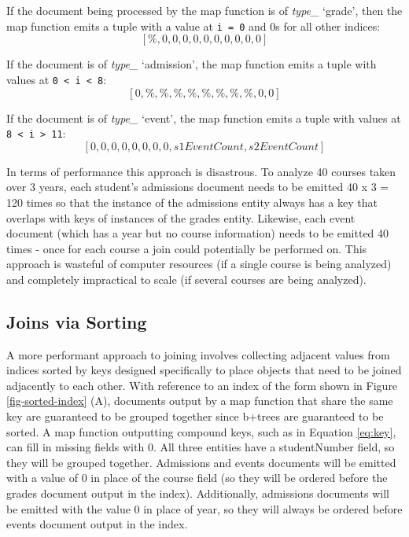 If the document being processed by the map function is of \textit{type\_} ‘grade’, then the map function emits a tuple with a value at \texttt{i = 0} and 0s for all other indices: \[[\%, 0, 0, 0, 0, 0, 0, 0, 0, 0, 0]\]

If the document is of \textit{type\_} `admission', the map function emits a tuple with values at \texttt{0 < i < 8}: \[[0, \%, \%, \%, \%, \%, \%, \%, \%, 0, 0]\]

If the document is of \textit{type\_} ‘event’, the map function emits a tuple with values at \texttt{8 < i > 11}: \[[0, 0, 0, 0, 0, 0, 0, 0, s1EventCount, s2EventCount]\]

In terms of performance this approach is disastrous. To analyze 40 courses taken over 3 years, each student’s admissions document needs to be emitted 40 x 3 = 120 times so that the instance of the admissions entity always has a key that overlaps with keys of instances of the grades entity. Likewise, each event document (which has a year but no course information) needs to be emitted 40 times - once for each course a join could potentially be performed on. This approach is wasteful of computer resources (if a single course is being analyzed) and completely impractical to scale (if several courses are being analyzed).

\subsection{Joins via Sorting}
A more performant approach to joining involves collecting adjacent values from indices sorted by keys designed specifically to place objects that need to be joined adjacently to each other. With reference to an index of the form shown in Figure \ref{fig-sorted-index} (A), documents output by a map function that share the same key are guaranteed to be grouped together since b+trees are guaranteed to be sorted. A map function outputting compound keys, such as in Equation \ref{eq:key}, can fill in missing fields with $0$. All three entities have a studentNumber field, so they will be grouped together. Admissions and events documents will be emitted with a value of $0$ in place of the course field (so they will be ordered before the grades document output in the index). Additionally, admissions documents will be emitted with the value $0$ in place of year, so they will always be ordered before events document output in the index.


